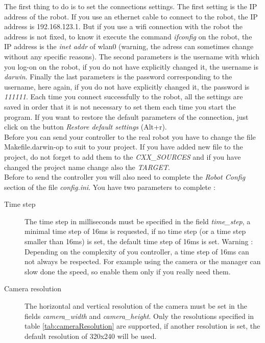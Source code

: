 \documentclass[a4paper, 12pt]{article}  		%
\begin{document}
The first thing to do is to set the connections settings. The first setting is the IP address of the robot. If you use an ethernet cable to connect to the robot, the IP address is 192.168.123.1. But if you use a wifi connection with the robot the address is not fixed, to know it execute the command \textit{ifconfig} on the robot, the IP address is the \textit{inet addr} of wlan0 (warning, the adress can sometimes change without any specific reasons). The second parameters is the username with which you log-on on the robot, if you do not have explicitly changed it, the username is \textit{darwin}. Finally the last parameters is the password corresponding to the username, here again, if you do not have explicitly changed it, the password is \textit{111111}. Each time you connect successfully to the robot, all the settings are saved in order that it is not necessary to set them each time you start the program. If you want to restore the default parameters of the connection, just click on the button \textit{Restore default settings} (Alt+r).\\

Before you can send your controller to the real robot you have to change the file Makefile.darwin-op to suit to your project. If you have added new file to the project, do not forget to add them to the \textit{CXX\_SOURCES} and if you have changed the project name change also the \textit{TARGET}.\\

\newpage
Before to send the controller you will also need to complete the \textit{Robot Config} section of the file \textit{config.ini}. You have two parameters to complete :
\begin{description}
\item[Time step] The time step in milliseconds must be specified in the field \textit{time\_step}, a minimal time step of 16ms is requested, if no time step (or a time step smaller than 16ms) is set, the default time step of 16ms is set. Warning : Depending on the complexity of you controller, a time step of 16ms can not always be respected. For example using the camera or the manager can slow done the speed, so enable them only if you really need them.\\
\item[Camera resolution] The horizontal and vertical resolution of the camera must be set in the fields \textit{camera\_width} and \textit{camera\_height}. Only the resolutions specified in table \ref{tab:cameraResolution} are supported, if another resolution is set, the default resolution of 320x240 will be used.\\
\end{description}
\end{document}
